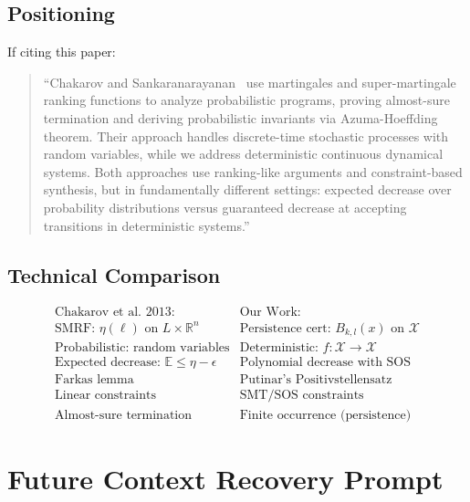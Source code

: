 \documentclass{article}
\begin{document}
\subsection{Positioning}

If citing this paper:

\begin{quote}
``Chakarov and Sankaranarayanan~\cite{chakarov2013martingales} use martingales and super-martingale ranking functions to analyze probabilistic programs, proving almost-sure termination and deriving probabilistic invariants via Azuma-Hoeffding theorem. Their approach handles discrete-time stochastic processes with random variables, while we address deterministic continuous dynamical systems. Both approaches use ranking-like arguments and constraint-based synthesis, but in fundamentally different settings: expected decrease over probability distributions versus guaranteed decrease at accepting transitions in deterministic systems.''
\end{quote}

\subsection{Technical Comparison}

\begin{equation}
\begin{array}{cc}
\text{Chakarov et al. 2013:} & \text{Our Work:}\\
\text{SMRF: } \eta(\ell) \text{ on } L \times \mathbb{R}^n & \text{Persistence cert: } B_{k,l}(x) \text{ on } \mathcal{X}\\
\text{Probabilistic: random variables} & \text{Deterministic: } f: \mathcal{X} \to \mathcal{X}\\
\text{Expected decrease: } \mathbb{E} \leq \eta - \epsilon & \text{Polynomial decrease with SOS}\\
\text{Farkas lemma} & \text{Putinar's Positivstellensatz}\\
\text{Linear constraints} & \text{SMT/SOS constraints}\\
\text{Almost-sure termination} & \text{Finite occurrence (persistence)}
\end{array}
\end{equation}

\section{Future Context Recovery Prompt}
\end{document}
